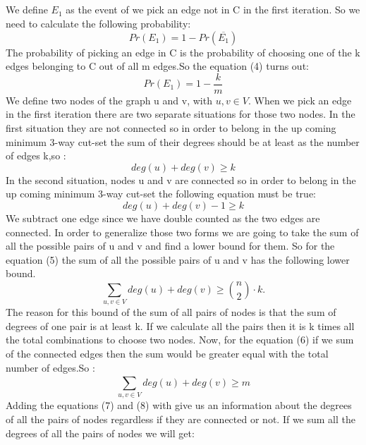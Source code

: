 \documentclass[11pt]{537homework}
\begin{document}
\subsection{}
We define $E_1$ as the event of we pick an edge not in C in the first iteration. So we need to calculate the following probability:
\begin{equation}
    Pr(E_1) = 1 - Pr(\overline{E_1})
\end{equation}
The probability of picking an edge in C is the probability of choosing one of the k edges belonging to C out of all m edges.So the equation (4) turns out:
\begin{equation*}
    Pr(E_1) = 1 - \frac{k}{m}
\end{equation*}
We define two nodes of the graph u and v, with $u,v \in V$. When we pick an edge in the first iteration there are two separate situations for those two nodes. In the first situation they are not connected so in order to belong in the up coming minimum 3-way cut-set the sum of their degrees should be at least as the number of edges k,so : 
\begin{equation}
deg(u)+deg(v) \geq k
\end{equation}
In the second situation, nodes u and v are connected so in order to belong in the up coming minimum 3-way cut-set the following equation must be true:
\begin{equation}
deg(u)+deg(v) -1 \geq k
\end{equation}
We subtract one edge since we have double counted as the two edges are connected.
In order to generalize those two forms we are going to take the sum of all the possible pairs of u and v and find a lower bound for them. So for the equation (5) the sum of all the possible pairs of u and v has the following lower bound.
\begin{equation}
 \sum_{u,v \in V}^{} deg(u)+deg(v) \geq {{n}\choose{2}} \cdot k.
\end{equation}
The reason for this bound of the sum of all pairs of nodes is that the sum of degrees of one pair is at least k. If we calculate all the pairs then it is k times all the total combinations to choose two nodes. Now, for the equation (6) if we sum of the connected edges then the sum would be greater equal with the total number of edges.So :
\begin{equation}
 \sum_{u,v \in V}^{} deg(u)+deg(v) \geq m
\end{equation}
Adding the equations (7) and (8) with give us an information about the degrees of all the pairs of nodes regardless if they are connected or not. If we sum all the degrees of all the pairs of nodes we will get:
\end{document}
